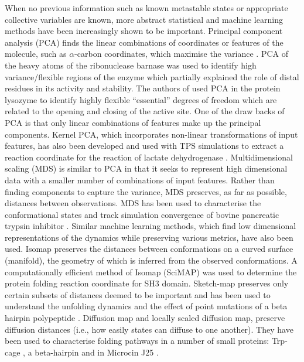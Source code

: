 When no previous information such as known metastable states or appropriate collective variables are known, more abstract statistical and machine learning methods have been increasingly shown to be important. Principal component analysis (PCA) finds the linear combinations of coordinates or features of the molecule, such as $\alpha$-carbon coordinates, which maximise the variance \cite{pearson1901liii}. PCA of the heavy atoms of the ribonuclease barnase \cite{noldeEssentialDomainMotions2002} was used to identify high variance/flexible regions of the enzyme which partially explained the role of distal residues in its activity and stability. The authors of \cite{amadeiEssentialDynamicsProteins1993a} used PCA in the  protein lysozyme to identify highly flexible ``essential'' degrees of freedom which are related to the opening and closing of the active site.  One of the draw backs of PCA is that only linear combinations of features make up the principal components.  Kernel PCA, which incorporates non-linear transformations of input features, has also been developed and used with TPS simulations to extract a reaction coordinate for the reaction of lactate  dehydrogenase \cite{antoniouIdentificationReactionCoordinate2011,quaytmanReactionCoordinateEnzymatic2007}. Multidimensional scaling (MDS) \cite{borg1997modern} is similar to PCA in that it seeks to represent high dimensional data with a smaller number of  combinations of input features. Rather than finding components to capture the variance, MDS preserves, as far as possible, distances between observations.  MDS has been used to characterise the conformational states and track simulation convergence of bovine pancreatic trypsin inhibitor \cite{troyerProteinConformationalLandscapes1995}. Similar machine learning methods, which find low dimensional representations of the dynamics while preserving various metrics, have also been used.  Isomap \cite{tenenbaumGlobalGeometricFramework2000} preserves the distances between conformations on a curved surface (manifold), the geometry of which is inferred from the observed conformations. A computationally efficient method of Isomap (SciMAP) \cite{dasLowdimensionalFreeenergyLandscapes2006} was used to determine the protein folding reaction coordinate for SH3 domain. Sketch-map \cite{ceriottiSimplifyingRepresentationComplex2011} preserves only certain subsets of distances deemed to be important and has been used to understand the unfolding dynamics and the effect of point mutations of a beta hairpin polypeptide \cite{ardevolProbingUnfoldedConfigurations2015}. 
Diffusion map \cite{fergusonNonlinearDimensionalityReduction2011} and locally scaled diffusion map, preserve diffusion distances (i.e., how easily states can diffuse to one another). They have been used to characterise folding pathways in a number of small proteins:  Trp-cage \cite{kimSystematicCharacterizationProtein2015}, a beta-hairpin \cite{zhengDelineationFoldingPathways2011} and in Microcin J25 \cite{fergusonNonlinearDimensionalityReduction2011}. 

